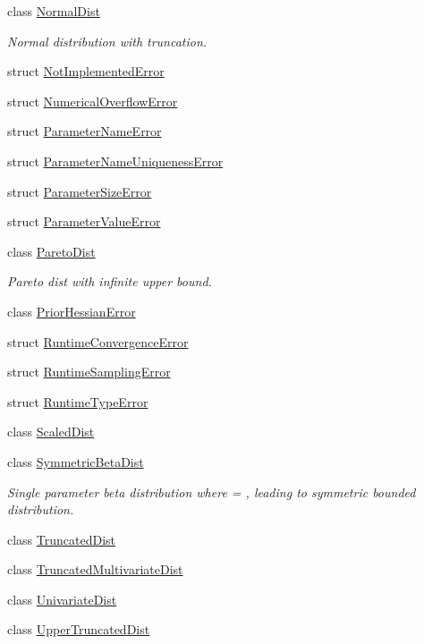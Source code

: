 \begin{DoxyCompactItemize}
class \hyperlink{classprior__hessian_1_1NormalDist}{Normal\+Dist}
\begin{DoxyCompactList}\small\item\em Normal distribution with truncation. \end{DoxyCompactList}\item 
struct \hyperlink{structprior__hessian_1_1NotImplementedError}{Not\+Implemented\+Error}
\item 
struct \hyperlink{structprior__hessian_1_1NumericalOverflowError}{Numerical\+Overflow\+Error}
\item 
struct \hyperlink{structprior__hessian_1_1ParameterNameError}{Parameter\+Name\+Error}
\item 
struct \hyperlink{structprior__hessian_1_1ParameterNameUniquenessError}{Parameter\+Name\+Uniqueness\+Error}
\item 
struct \hyperlink{structprior__hessian_1_1ParameterSizeError}{Parameter\+Size\+Error}
\item 
struct \hyperlink{structprior__hessian_1_1ParameterValueError}{Parameter\+Value\+Error}
\item 
class \hyperlink{classprior__hessian_1_1ParetoDist}{Pareto\+Dist}
\begin{DoxyCompactList}\small\item\em Pareto dist with infinite upper bound. \end{DoxyCompactList}\item 
class \hyperlink{classprior__hessian_1_1PriorHessianError}{Prior\+Hessian\+Error}
\item 
struct \hyperlink{structprior__hessian_1_1RuntimeConvergenceError}{Runtime\+Convergence\+Error}
\item 
struct \hyperlink{structprior__hessian_1_1RuntimeSamplingError}{Runtime\+Sampling\+Error}
\item 
struct \hyperlink{structprior__hessian_1_1RuntimeTypeError}{Runtime\+Type\+Error}
\item 
class \hyperlink{classprior__hessian_1_1ScaledDist}{Scaled\+Dist}
\item 
class \hyperlink{classprior__hessian_1_1SymmetricBetaDist}{Symmetric\+Beta\+Dist}
\begin{DoxyCompactList}\small\item\em Single parameter beta distribution where  = , leading to symmetric bounded distribution. \end{DoxyCompactList}\item 
class \hyperlink{classprior__hessian_1_1TruncatedDist}{Truncated\+Dist}
\item 
class \hyperlink{classprior__hessian_1_1TruncatedMultivariateDist}{Truncated\+Multivariate\+Dist}
\item 
class \hyperlink{classprior__hessian_1_1UnivariateDist}{Univariate\+Dist}
\item 
class \hyperlink{classprior__hessian_1_1UpperTruncatedDist}{Upper\+Truncated\+Dist}
\end{DoxyCompactItemize}
